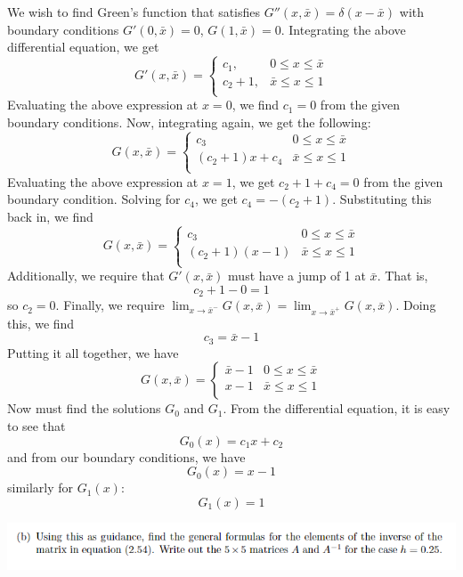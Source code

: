 \documentclass{article}
\begin{document}
We wish to find Green's function that satisfies $G''(x,\bar{x}) = \delta(x - \bar{x})$ with boundary conditions $G'(0,\bar{x}) = 0$, $G(1,\bar{x}) = 0$. Integrating the above differential equation, we get
\[G'(x,\bar{x}) = \begin{cases}
    c_1, & 0 \leq x \leq \bar{x}\\
    c_2 + 1, & \bar{x} \leq x \leq 1\\
\end{cases}\]
Evaluating the above expression at $x = 0$, we find $c_1 = 0$ from the given boundary conditions. Now, integrating again, we get the following:
\[G(x,\bar{x}) = \begin{cases}
    c_3 & 0 \leq x \leq \bar{x}\\
    (c_2 + 1)x + c_4 & \bar{x} \leq x \leq 1\\
\end{cases}\]
Evaluating the above expression at $x = 1$, we get $c_2 + 1 + c_4 = 0$ from the given boundary condition. Solving for $c_4$, we get $c_4 = -(c_2 + 1)$. Substituting this back in, we find
\[G(x, \bar{x}) = \begin{cases}
    c_3 & 0 \leq x \leq \bar{x}\\
    (c_2 + 1)(x - 1) & \bar{x} \leq x \leq 1\\
\end{cases}\]
Additionally, we require that $G'(x, \bar{x})$ must have a jump of 1 at $\bar{x}$. That is, 
\[c_2 + 1 - 0 = 1\]
so $c_2 = 0$. Finally, we require $\lim_{x \to \bar{x}^-} G(x, \bar{x}) = \lim_{x \to \bar{x}^+} G(x, \bar{x})$. Doing this, we find 
\[c_3 = \bar{x} - 1\]
Putting it all together, we have
\[G(x, \bar{x}) = \begin{cases}
    \bar{x} - 1 & 0 \leq x \leq \bar{x}\\
    x - 1 & \bar{x} \leq x \leq 1\\
\end{cases}\]
 Now must find the solutions $G_0$ and $G_1$. From the differential equation, it is easy to see that
 \[G_0(x) = c_1x + c_2\]
 and from our boundary conditions, we have
 \[G_0(x) = x - 1\]
 similarly for $G_1(x)$:
 \[G_1(x) = 1\]
 
 
\includegraphics[scale = 0.75]{prob2b.PNG}
\newline\newline
\end{document}
